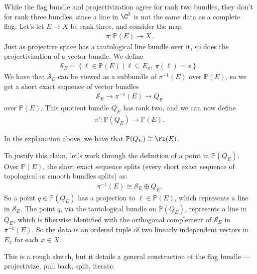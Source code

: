 \documentclass[11pt]{book}
\begin{document}
While the flag bundle and projectivization agree for rank two bundles, they don't for rank three bundles, since a line in $\C^3$ is not the same data as a complete flag. Let's let $E \to X$ be rank three, and consider the map
\begin{align*}
    \pi \colon \mathbb{P}(E) \to X.
\end{align*}
Just as projective space has a tautological line bundle over it, so does the projectivization of a vector bundle. We define
\begin{align*}
    \mathcal{S}_E = \left\{ \ell \in \mathbb{P}(E) \mid \ell \subseteq E_x,\ \pi(\ell) = x \right\}.
\end{align*}
%
We have that $\mathcal{S}_E$ can be viewed as a subbundle of $\pi^{-1}(E)$ over $\mathbb{P}(E)$, so we get a short exact sequence of vector bundles
\begin{align*}
    \mathcal{S}_E \to \pi^{-1}(E) \to Q_E
\end{align*}
over $\mathbb{P}(E)$. This quotient bundle $Q_E$ has rank two, and we can now define
\begin{align*}
    \pi' \colon \mathbb{P}(Q_E) \to \mathbb{P}(E).
\end{align*}

\begin{claim} In the explanation above, we have that $\mathbb{P}(Q_E) \cong \Fl(E)$.
\end{claim}

To justify this claim, let's work through the definition of a point in $\mathbb{P}(Q_E)$. Over $\mathbb{P}(E)$, the short exact sequence splits (every short exact sequence of topological or smooth bundles splits) as:
\begin{align*}
    \pi^{-1}(E) \cong \mathcal{S}_E \oplus Q_E.
\end{align*}
So a point $q\in \mathbb{P}(Q_E)$ has a projection to $\ell\in \mathbb{P}(E)$, which represents a line in $\mathcal{S}_E$. The point $q$, via the tautological bundle on $\mathbb{P}(Q_E)$, represents a line in $Q_E$, which is fiberwise identified with the orthogonal complement of $\mathcal{S}_E$ in $\pi^{-1}(E)$. So the data is an ordered tuple of two linearly independent vectors in $E_x$ for each $x\in X$.

This is a rough sketch, but it details a general construction of the flag bundle --- projectivize, pull back, split, iterate.
\end{document}
